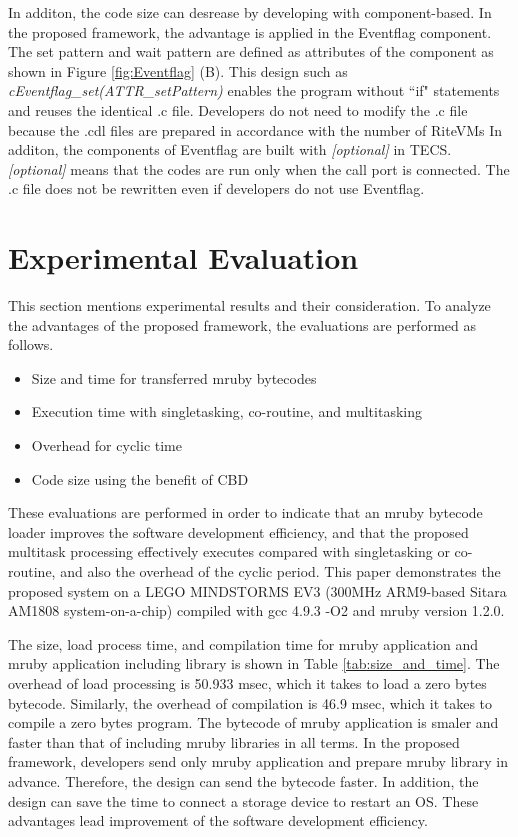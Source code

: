 \documentclass[conference,compsoc]{IEEEtran}
\begin{document}
In additon, the code size can desrease by developing with component-based. 
In the proposed framework, the advantage is applied in the Eventflag component.
The set pattern and wait pattern are defined as attributes of the component as shown in Figure \ref{fig:Eventflag} (B).
This design such as {\it cEventflag\_set(ATTR\_setPattern)} enables the program without ``if" statements and reuses the identical .c file.
Developers do not need to modify the .c file because the .cdl files are prepared in accordance with the number of RiteVMs
In additon, the components of Eventflag are built with {\it [optional]} in TECS.
{\it [optional]} means that the codes are run only when the call port is connected.
The .c file does not be rewritten even if developers do not use Eventflag. 

\section{Experimental Evaluation}
\label{sec:Evaluation}
This section mentions experimental results and their consideration.
To analyze the advantages of the proposed framework, the evaluations are performed as follows.
\begin{itemize}
    \item Size and time for transferred mruby bytecodes
    \item Execution time with singletasking, co-routine, and multitasking
    \item Overhead for cyclic time
    \item Code size using the benefit of CBD 
\end{itemize}

These evaluations are performed in order to indicate that an mruby bytecode loader improves the software development efficiency, and that the proposed multitask processing effectively executes compared with singletasking or co-routine, and also the overhead of the cyclic period.
This paper demonstrates the proposed system on a LEGO MINDSTORMS EV3 (300MHz ARM9-based Sitara AM1808 system-on-a-chip) compiled with gcc 4.9.3 -O2 and mruby version 1.2.0.

The size, load process time, and compilation time for mruby application and mruby application including library is shown in Table \ref{tab:size_and_time}.
The overhead of load processing is 50.933 msec, which it takes to load a zero bytes bytecode.
Similarly, the overhead of compilation is 46.9 msec, which it takes to compile a zero bytes program.
The bytecode of mruby application is smaler and faster than that of including mruby libraries in all terms.
In the proposed framework, developers send only mruby application and prepare mruby library in advance.
Therefore, the design can send the bytecode faster.
In addition, the design can save the time to connect a storage device to restart an OS.
These advantages lead improvement of the software development efficiency.
\end{document}
